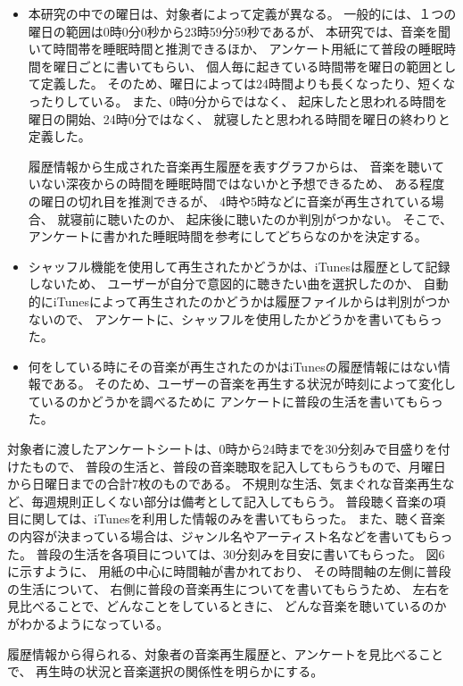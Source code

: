 \documentclass[a4paper, 11pt, onecolumn, report]{jsarticle}
\begin{document}
\begin{itemize}

\item
本研究の中での曜日は、対象者によって定義が異なる。
一般的には、１つの曜日の範囲は0時0分0秒から23時59分59秒であるが、
本研究では、音楽を聞いて時間帯を睡眠時間と推測できるほか、
アンケート用紙にて普段の睡眠時間を曜日ごとに書いてもらい、
個人毎に起きている時間帯を曜日の範囲として定義した。
そのため、曜日によっては24時間よりも長くなったり、短くなったりしている。
また、0時0分からではなく、
起床したと思われる時間を曜日の開始、24時0分ではなく、
就寝したと思われる時間を曜日の終わりと定義した。

履歴情報から生成された音楽再生履歴を表すグラフからは、
音楽を聴いていない深夜からの時間を睡眠時間ではないかと予想できるため、
ある程度の曜日の切れ目を推測できるが、
4時や5時などに音楽が再生されている場合、
就寝前に聴いたのか、
起床後に聴いたのか判別がつかない。
そこで、アンケートに書かれた睡眠時間を参考にしてどちらなのかを決定する。
\item
シャッフル機能を使用して再生されたかどうかは、iTunesは履歴として記録しないため、
ユーザーが自分で意図的に聴きたい曲を選択したのか、
自動的にiTunesによって再生されたのかどうかは履歴ファイルからは判別がつかないので、
アンケートに、シャッフルを使用したかどうかを書いてもらった。
\item
何をしている時にその音楽が再生されたのかはiTunesの履歴情報にはない情報である。
そのため、ユーザーの音楽を再生する状況が時刻によって変化しているのかどうかを調べるために
アンケートに普段の生活を書いてもらった。
\end{itemize}


対象者に渡したアンケートシートは、0時から24時までを30分刻みで目盛りを付けたもので、
普段の生活と、普段の音楽聴取を記入してもらうもので、月曜日から日曜日までの合計7枚のものである。
不規則な生活、気まぐれな音楽再生など、毎週規則正しくない部分は備考として記入してもらう。
普段聴く音楽の項目に関しては、iTunesを利用した情報のみを書いてもらった。
また、聴く音楽の内容が決まっている場合は、ジャンル名やアーティスト名などを書いてもらった。
普段の生活を各項目については、30分刻みを目安に書いてもらった。
図6に示すように、%
用紙の中心に時間軸が書かれており、
その時間軸の左側に普段の生活について、
右側に普段の音楽再生についてを書いてもらうため、
左右を見比べることで、どんなことをしているときに、
どんな音楽を聴いているのかがわかるようになっている。

履歴情報から得られる、対象者の音楽再生履歴と、アンケートを見比べることで、
再生時の状況と音楽選択の関係性を明らかにする。
\end{document}
